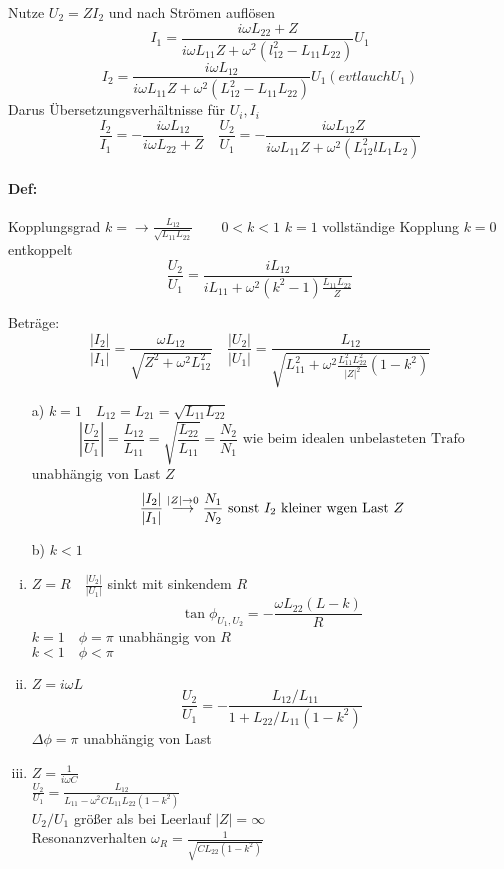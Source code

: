\documentclass[titlepage,12pt,a4paper,ngerman]{report}
\newcommand{\tx}[1]{\textrm{#1}}
\begin{document}
Nutze $ U_2 = Z I_2 $ und nach Strömen auflösen
$$ I_1 = \frac{i \omega L_{22} + Z}{i \omega L_{11} Z + \omega^2 (l_{12}^2 - L_{11} L_{22})} U_1 $$
$$ I_2 = \frac{i \omega L_{12}}{i \omega L_{11} Z + \omega^2 (L_{12}^2 - L_{11} L_{22})} U_1 (evtl auch U_1) $$
Darus Übersetzungsverhältnisse für $ U_i, I_i $
$$ \frac{I_2}{I_1} = - \frac{i \omega L_{12}}{i \omega L_{22} + Z} \quad \frac{U_2}{U_1} = - \frac{i \omega L_{12} Z}{i \omega L_{11} Z + \omega^2 (L_{12}^2 l L_1 L_2)}$$

\paragraph{Def:} Kopplungsgrad $k= \rightarrow \frac{L_{12}}{\sqrt{L_{11}L_{22}}} \qquad 0<k<1$
$k=1$ vollständige Kopplung $k = 0$ entkoppelt
$$\frac{U_2}{U_1} = \frac{i L_{12}}{i L_{11}+\omega^2 (k^2 - 1) \frac{L_{11}L_{22}}{Z}}$$

Beträge: $$ \frac{|I_2|}{|I_1|} = \frac{\omega L_{12}}{\sqrt{Z^2+\omega^2 L_{12}^2}} \quad \frac{|U_2|}{|U_1|} = \frac{L_{12}}{\sqrt{ L_{11}^2 + \omega^2 \frac{L_{11}^2 L_{22}^2}{|Z|^2} (1-k^2)}}$$

\begin{enumerate}
 	\item[a)] $k = 1 \quad L_{12} = L_{21} = \sqrt{L_{11}L_{22}}$
 	$$|\frac{U_2}{U_1}| = \frac{L_{12}}{L_{11}} = \sqrt{\frac{L_{22}}{L_{11}}} = \frac{N_2}{N_1} \tx{ wie beim idealen unbelasteten Trafo}$$
 	unabhängig von Last $Z$
 	$$\frac{|I_2|}{|I_1|}  \buildrel{|Z| \rightarrow 0} \over \longrightarrow \frac{N_1}{N_2} \tx{ sonst $I_2$ kleiner wgen Last }Z$$
 	\item[b)] $ k<1 $
 \end{enumerate}
\begin{enumerate}[i)]
	\item $ Z=R\quad \frac{|U_2|}{|U_1|} $ sinkt mit sinkendem $R$
	$$\tan \phi_{U_1,U_2} = -\frac{\omega L_{22}(L-k)}{R}$$
	$k=1 \quad \phi = \pi$ unabhängig von $R$\\
	$k<1 \quad \phi <\pi$ 
	\item   $Z = i \omega L$
	$$\frac{U_2}{U_1} = - \frac{L_{12}/L_{11}}{1+ L_{22}/L_{11} (1-k^2)}$$
	$\Delta \phi = \pi$ unabhängig von Last

	\item $ Z = \frac{1}{i \omega C} $\\
	$ \frac{U_2}{U_1} = \frac{L_{12}}{L_{11} - \omega^2 C L_{11} L_{22} (1-k^2)} $\\
	$ U_2/U_1 $ größer als bei Leerlauf $ |Z| = \infty $\\
	Resonanzverhalten $ \omega_R = \frac{1}{\sqrt{C L_{22} (1-k^2)}} $
\end{enumerate}
\end{document}
